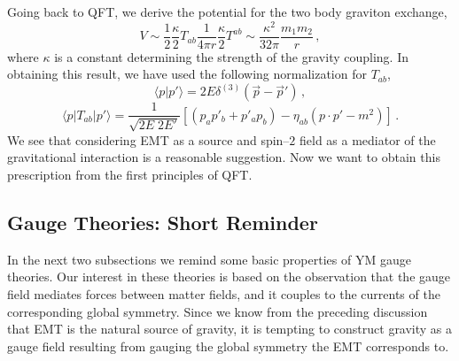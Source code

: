 \documentclass[12pt]{article}
\begin{document}
Going back to QFT, we derive the potential for the two body graviton exchange,
\begin{equation}
V\sim\dfrac{1}{2}\dfrac{\kappa}{2}T_{ab}\dfrac{1}{4\pi r}\dfrac{\kappa}{2}T^{ab}\sim\dfrac{\kappa^2}{32\pi}\dfrac{m_1m_2}{r}   \,,
\end{equation}
where $\kappa$ is a constant determining the strength of the gravity coupling. In obtaining this result, we have used the following normalization for $T_{ab}$,
\begin{equation}
\langle p\vert p'\rangle=2E\delta^{(3)}(\vec{p}-\vec{p}')   \,,
\end{equation}
\begin{equation}
\langle p\vert T_{ab}\vert p'\rangle=\dfrac{1}{\sqrt{2E\;2E'}}\left[(p_a p'_b+p'_a p_b)-\eta_{ab}(p\cdot p'-m^2)\right]    \,.
\end{equation}
We see that considering EMT as a source and spin--$2$ field as a mediator of the gravitational interaction is a reasonable suggestion. Now we want to obtain this prescription from the first principles of QFT.

\subsection{Gauge Theories: Short Reminder}

In the next two subsections we remind some basic properties of YM gauge theories. Our interest in these theories is based on the observation that the gauge field mediates forces between matter fields, and it couples to the currents of the corresponding global symmetry. Since we know from the preceding discussion that EMT is the natural source of gravity, it is tempting to construct gravity as a gauge field resulting from gauging the global symmetry the EMT corresponds to.
\end{document}
